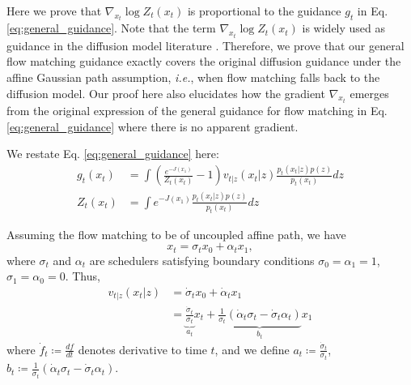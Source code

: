 Here we prove that $\nabla_{x_t} \log Z_t(x_t)$ is proportional to the guidance $g_t$ in Eq. \eqref{eq:general_guidance}. 
Note that the term $\nabla_{x_t} \log Z_t(x_t)$ is widely used as guidance in the diffusion model literature \citep{dhariwal_diffusion_2021,ho_classifier-free_2022,song_score-based_2021,song_loss-guided_2023,song_pseudoinverse-guided_2022,janner_planning_2022,ajay_is_2023}. Therefore, we prove that our general flow matching guidance exactly covers the original diffusion guidance under the affine Gaussian path assumption, \emph{i.e.}, when flow matching falls back to the diffusion model. Our proof here also elucidates how the gradient $\nabla_{x_t}$ emerges from the original expression of the general guidance for flow matching in Eq. \eqref{eq:general_guidance} where there is no apparent gradient.

We restate Eq. \eqref{eq:general_guidance} here:
\begin{align}\label{eq:appendix_restate:general_guidance}
    g_t(x_t) & = \int (\frac{e^{-J(x_1)}}{Z_t(x_t)} - 1) v_{t|z}(x_t|z) \frac{p_t(x_t|z)p(z)}{p_t(x_t)} dz \\
    Z_t(x_t) & =  \int e^{-J(x_1)} \frac{p_t(x_t|z)p(z)}{p_t(x_t)} dz
\end{align}

Assuming the flow matching to be of uncoupled affine path, we have
\begin{equation}
    x_t = \sigma_t x_0 + \alpha_t x_1,
\end{equation}
where $\sigma_t$ and $\alpha_t$ are schedulers satisfying boundary conditions $\sigma_0 = \alpha_1 = 1$, $\sigma_1 = \alpha_0 = 0$.
Thus, 
\begin{align}
\nonumber
    v_{t|z}(x_t|z) & = \dot\sigma_t x_0 + \dot\alpha_t x_1 
    \\
    \label{eq:appendix:general_guidance_and_diffusion_guidance_affine_path}
    & =  \underbrace{\frac{\dot\sigma_t}{\sigma_t}}_{a_t} x_t + \underbrace{\frac{1}{\sigma_t} (\dot\alpha_t \sigma_t - \dot\sigma_t \alpha_t)}_{b_t} x_1 
\end{align}
where $\dot f_t \coloneqq \frac{d f}{d t}$ denotes derivative to time $t$, and we define $a_t\coloneqq \frac{\dot\sigma_t}{\sigma_t}$, $b_t\coloneqq \frac{1}{\sigma_t} (\dot\alpha_t \sigma_t - \dot\sigma_t \alpha_t)$.

